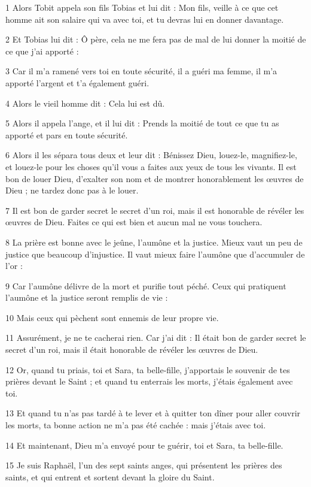 
\par 1 Alors Tobit appela son fils Tobias et lui dit : Mon fils, veille à ce que cet homme ait son salaire qui va avec toi, et tu devras lui en donner davantage.
\par 2 Et Tobias lui dit : Ô père, cela ne me fera pas de mal de lui donner la moitié de ce que j'ai apporté :
\par 3 Car il m'a ramené vers toi en toute sécurité, il a guéri ma femme, il m'a apporté l'argent et t'a également guéri.
\par 4 Alors le vieil homme dit : Cela lui est dû.
\par 5 Alors il appela l'ange, et il lui dit : Prends la moitié de tout ce que tu as apporté et pars en toute sécurité.
\par 6 Alors il les sépara tous deux et leur dit : Bénissez Dieu, louez-le, magnifiez-le, et louez-le pour les choses qu'il vous a faites aux yeux de tous les vivants. Il est bon de louer Dieu, d'exalter son nom et de montrer honorablement les œuvres de Dieu ; ne tardez donc pas à le louer.
\par 7 Il est bon de garder secret le secret d'un roi, mais il est honorable de révéler les œuvres de Dieu. Faites ce qui est bien et aucun mal ne vous touchera.
\par 8 La prière est bonne avec le jeûne, l'aumône et la justice. Mieux vaut un peu de justice que beaucoup d’injustice. Il vaut mieux faire l'aumône que d'accumuler de l'or :
\par 9 Car l'aumône délivre de la mort et purifie tout péché. Ceux qui pratiquent l’aumône et la justice seront remplis de vie :
\par 10 Mais ceux qui pèchent sont ennemis de leur propre vie.
\par 11 Assurément, je ne te cacherai rien. Car j'ai dit : Il était bon de garder secret le secret d'un roi, mais il était honorable de révéler les œuvres de Dieu.
\par 12 Or, quand tu priais, toi et Sara, ta belle-fille, j'apportais le souvenir de tes prières devant le Saint ; et quand tu enterrais les morts, j'étais également avec toi.
\par 13 Et quand tu n'as pas tardé à te lever et à quitter ton dîner pour aller couvrir les morts, ta bonne action ne m'a pas été cachée : mais j'étais avec toi.
\par 14 Et maintenant, Dieu m'a envoyé pour te guérir, toi et Sara, ta belle-fille.
\par 15 Je suis Raphaël, l'un des sept saints anges, qui présentent les prières des saints, et qui entrent et sortent devant la gloire du Saint.
